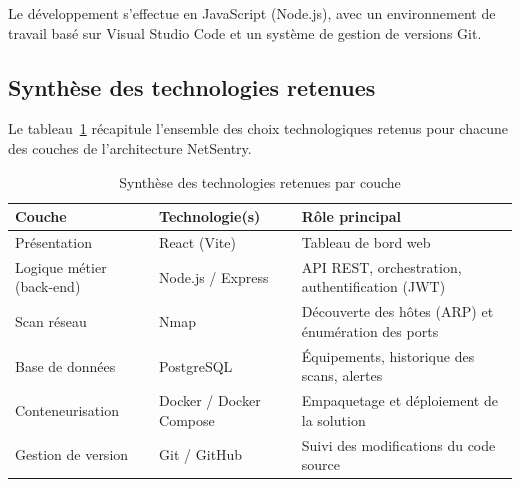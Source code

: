 Le développement s'effectue en JavaScript (Node.js), avec un environnement de travail
basé sur Visual Studio Code et un système de gestion de versions Git.

\subsection{Synthèse des technologies retenues}

Le tableau~\ref{tab:technos} récapitule l'ensemble des choix technologiques retenus pour
chacune des couches de l'architecture NetSentry.

\begin{table}[H]
    \centering
    \caption{Synthèse des technologies retenues par couche}
    \label{tab:technos}
    \begin{tabular}{@{}>{\raggedright\arraybackslash}p{3.6cm} >{\raggedright\arraybackslash}p{4.4cm} >{\raggedright\arraybackslash}p{6.6cm}@{}}
        \toprule
        \textbf{Couche} & \textbf{Technologie(s)} & \textbf{Rôle principal} \\
        \midrule
        Présentation & React (Vite) & Tableau de bord web \\
        Logique métier (back-end) & Node.js / Express & API REST, orchestration, authentification (JWT) \\
        Scan réseau & Nmap & Découverte des hôtes (ARP) et énumération des ports \\
        Base de données & PostgreSQL & Équipements, historique des scans, alertes \\
        Conteneurisation & Docker / Docker Compose & Empaquetage et déploiement de la solution \\
        Gestion de version & Git / GitHub & Suivi des modifications du code source \\
        \bottomrule
    \end{tabular}
\end{table}
